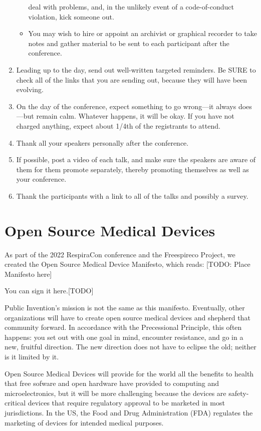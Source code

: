 \documentclass[
	fontsize=10pt, %
	twoside=false, %
	secnumdepth=1, %
]{kaobook}
\begin{document}
\begin{enumerate}
\begin{itemize}
    deal with problems, and, in the unlikely event of a code-of-conduct violation, kick someone out.
  \item You may wish to hire or appoint an archivist or graphical recorder to take notes and gather
    material to be sent to each participant after the conference.
  \end{itemize}
\item Leading up to the day, send out well-written targeted reminders. Be SURE to check all of the links
  that you are sending out, because they will have been evolving.
\item On the day of the conference, expect something to go wrong---it always does---but remain calm.
  Whatever happens, it will be okay. If you have not charged anything, expect about 1/4th of the
  registrants to attend.
\item Thank all your speakers personally after the conference.
\item If possible, post a video of each talk, and make sure the speakers are aware of them
  for them promote separately, thereby promoting themselves as well as your conference.
\item Thank the participants with a link to all of the talks and possibly a survey.
\end{enumerate}

\section{Open Source Medical Devices}

As part of the 2022 RespiraCon conference and the Freespireco Project, we created
the Open Source Medical Device Manifesto, which reads:
[TODO: Place Manifesto here]

You can sign it here.[TODO]

Public Invention's mission is not the same as this manifesto. Eventually,
other organizations will have to create open source medical devices and shepherd
that community forward.
In accordance with the Precessional Principle, this often happens: you set out
with one goal in mind, encounter resistance, and go in a new, fruitful direction.
The new direction does not have to eclipse the old; neither is it limited by it.

Open Source Medical Devices will provide for the world all the benefits to health
that free sofware and open hardware have provided to computing and microelectronics,
but it will be more challenging because the devices are safety-critical devices that
require regulatory approval to be marketed in most jurisdictions. In the US, the
Food and Drug Administration (FDA) regulates the marketing of devices for intended
medical purposes.
\end{document}
